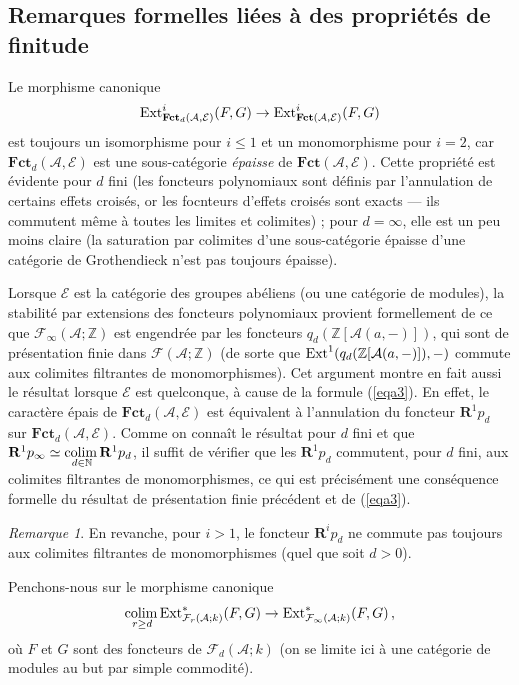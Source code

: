 \documentclass[a4paper,10pt]{article}
\newcommand{\A}{{\mathcal{A}}}
\newcommand{\F}{{\mathcal{F}}}
\newcommand{\fct}{\mathbf{Fct}}
\newcommand{\E}{{\mathcal{E}}}
\newcommand{\Pol}{\fct}
\newcommand{\col}{{\rm colim}\,}
\theoremstyle{definition}
\theoremstyle{remark}
\newtheorem{rem}[thm]{Remarque}
\begin{document}
\subsection{Remarques formelles liées à des propriétés de finitude}

Le morphisme canonique
$${\rm Ext}^i_{\Pol_d(\A,\E)}(F,G)\to {\rm Ext}^i_{\fct(\A,\E)}(F,G)$$
est toujours un isomorphisme pour $i\leq 1$ et un monomorphisme pour $i=2$, car $\Pol_d(\A,\E)$ est une sous-catégorie {\em épaisse} de $\fct(\A,\E)$. Cette propriété est évidente pour $d$ fini (les foncteurs polynomiaux sont définis par l'annulation de certains effets croisés, or les focnteurs d'effets croisés sont exacts --- ils commutent même à toutes les limites et colimites) ; pour $d=\infty$, elle est un peu moins claire (la saturation par colimites d'une sous-catégorie épaisse d'une catégorie de Grothendieck n'est pas toujours épaisse).

Lorsque $\E$ est la catégorie des groupes abéliens (ou une catégorie de modules), la stabilité par extensions des foncteurs polynomiaux provient formellement de ce que $\F_\infty(\A;\mathbb{Z})$ est engendrée par les foncteurs $q_d (\mathbb{Z}[\A(a,-)])$, qui sont de présentation finie dans $\F(\A;\mathbb{Z})$ (de sorte que ${\rm Ext}^1(q_d (\mathbb{Z}[\A(a,-)]),-)$ commute aux colimites filtrantes de monomorphismes). Cet argument montre en fait aussi le résultat lorsque $\E$ est quelconque, à cause de la formule (\ref{eqa3}). En effet, le caractère épais de $\Pol_d(\A,\E)$ est équivalent à l'annulation du foncteur $\mathbf{R}^1 p_d$ sur $\Pol_d(\A,\E)$. Comme on connaît le résultat pour $d$ fini et que $\mathbf{R}^1 p_\infty\simeq\underset{d\in\mathbb{N}}{\col}\mathbf{R}^1 p_d$, il suffit de vérifier que les $\mathbf{R}^1 p_d$ commutent, pour $d$ fini, aux colimites filtrantes de monomorphismes, ce qui est précisément une conséquence formelle du résultat de présentation finie précédent et de (\ref{eqa3}).

\begin{rem}\label{rcfm}
 En revanche, pour $i>1$, le foncteur $\mathbf{R}^i p_d$ ne commute pas toujours aux colimites filtrantes de monomorphismes (quel que soit $d>0$).
\end{rem}

Penchons-nous sur le morphisme canonique
$$\underset{r\geq d}{\col} {\rm Ext}^*_{\F_r(\A;k)}(F,G)\to {\rm Ext}^*_{\F_\infty(\A;k)}(F,G)\,,$$
où $F$ et $G$ sont des foncteurs de $\F_d(\A;k)$ (on se limite ici à une catégorie de modules au but par simple commodité).
\end{document}
